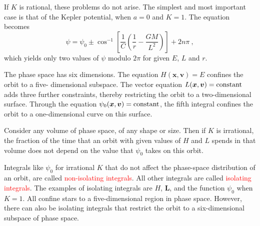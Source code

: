 \documentclass[12pt,a4paper]{article}
\renewcommand{\vec}[1]{\boldsymbol{#1}}
\begin{document}
If $K$ is rational, these problems do not arise. The simplest and most important case is that of the Kepler potential, when $a = 0$ and $K = 1$. The equation becomes
\begin{equation}
\psi = \psi_0 \pm \cos^{-1} \left[\frac{1}{C}\left(\frac{1}{r} -\frac{GM}{L^2}\right) \right] +2n\pi ~,
\end{equation}
which yields only two values of $\psi$ modulo $2\pi$ for given $E$, $L$ and $r$.

The phase space has six dimensions. The equation $H(\vec{x}, \vec{v}) = E$ confines the orbit to a five- dimensional subspace. The vector equation $L(\vec{x}, \vec{v}) = \rm constant$ adds three further constraints, thereby restricting the orbit to a two-dimensional surface. Through the equation $\psi_0(\vec{x}, \vec{v}) = \rm constant$, the fifth integral confines the orbit to a one-dimensional curve on this surface.

Consider any volume of phase space, of any shape or size. Then if $K$ is irrational, the fraction of the time that an orbit with given values of $H$ and $L$ spends in that volume does not depend on the value that $\psi_0$ takes on this orbit.









Integrals like $\psi_0$ for irrational $K$ that do not affect the phase-space distribution of an orbit, are called \textcolor{red}{non-isolating integrals}. All other integrals are called \textcolor{red}{isolating integrals}. The examples of isolating integrals are $H$, $\vec{L}$, and the function $\psi_0$ when $K = 1$. All confine stars to a five-dimensional region in phase space. However, there can also be isolating integrals that restrict the orbit to a six-dimensional subspace of phase space.











\end{document}
